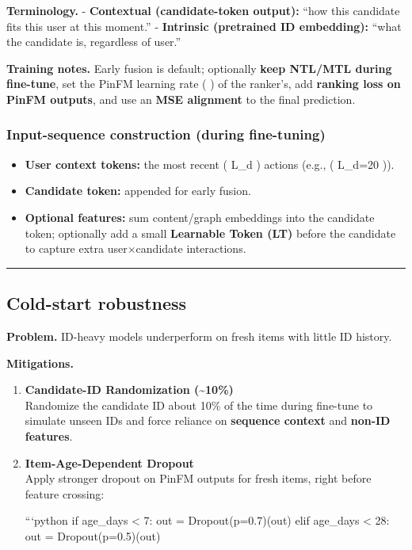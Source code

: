 \documentclass[
  letterpaper,
  DIV=11,
  numbers=noendperiod]{scrartcl}
\providecommand{\tightlist}{%
  \setlength{\itemsep}{0pt}\setlength{\parskip}{0pt}}
\begin{document}
\textbf{Terminology.} - \textbf{Contextual (candidate-token output):}
``how this candidate fits this user at this moment.'' -
\textbf{Intrinsic (pretrained ID embedding):} ``what the candidate is,
regardless of user.''

\textbf{Training notes.} Early fusion is default; optionally
\textbf{keep NTL/MTL during fine-tune}, set the PinFM learning rate (
\approx {} ) of the ranker's, add \textbf{ranking loss on
PinFM outputs}, and use an \textbf{MSE alignment} to the final
prediction.

\subsubsection{Input-sequence construction (during
fine-tuning)}\label{input-sequence-construction-during-fine-tuning}

\begin{itemize}
\tightlist
\item
  \textbf{User context tokens:} the most recent ( L\_d ) actions (e.g.,
  ( L\_d=20 )).
\item
  \textbf{Candidate token:} appended for early fusion.
\item
  \textbf{Optional features:} sum content/graph embeddings into the
  candidate token; optionally add a small \textbf{Learnable Token (LT)}
  before the candidate to capture extra user×candidate interactions.
\end{itemize}

\begin{center}\rule{0.5\linewidth}{0.5pt}\end{center}

\subsection{Cold-start robustness}\label{cold-start-robustness}

\textbf{Problem.} ID-heavy models underperform on fresh items with
little ID history.

\textbf{Mitigations.}

\begin{enumerate}
\def\labelenumi{\arabic{enumi}.}
\item
  \textbf{Candidate-ID Randomization (\textasciitilde10\%)}\\
  Randomize the candidate ID about 10\% of the time during fine-tune to
  simulate unseen IDs and force reliance on \textbf{sequence context}
  and \textbf{non-ID features}.
\item
  \textbf{Item-Age-Dependent Dropout}\\
  Apply stronger dropout on PinFM outputs for fresh items, right before
  feature crossing:

  ```python if age\_days \textless{} 7: out = Dropout(p=0.7)(out) elif
  age\_days \textless{} 28: out = Dropout(p=0.5)(out)
\end{enumerate}
\end{document}

